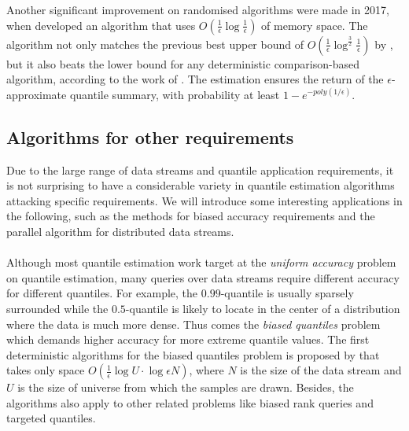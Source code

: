 Another significant improvement on randomised algorithms were made in 2017, when \citeauthor{felberRandomizedOnlineQuantile2017}\cite{felberRandomizedOnlineQuantile2017} developed an algorithm that uses $O(\frac{1}{\epsilon}\log \frac{1}{\epsilon})$ of memory space. The algorithm not only matches the previous best upper bound of $O(\frac{1}{\epsilon}\log^{\frac{3}{2}}\frac{1}{\epsilon})$ by \citeauthor{agarwalMergeableSummaries2013}\cite{agarwalMergeableSummaries2013}, but it also beats the lower bound for any deterministic comparison-based algorithm, according to the work of \citeauthor{hungLogSpaceLower2010}\cite{hungLogSpaceLower2010}. The estimation ensures the return of the $\epsilon$-approximate quantile summary, with probability at least $1-e^{-poly(1/\epsilon)}$.


\subsection{Algorithms for other requirements}
\label{other}
Due to the large range of data streams and quantile application requirements, it is not surprising to have a considerable variety in quantile estimation algorithms attacking specific requirements. We will introduce some interesting applications in the following, such as the methods for biased accuracy requirements and the parallel algorithm for distributed data streams.
\\\\
Although most quantile estimation work target at the \textit{uniform accuracy} problem on quantile estimation, many queries over data streams require different accuracy for different quantiles. For example, the $0.99$-quantile is usually sparsely surrounded while the $0.5$-quantile is likely to locate in the center of a distribution where the data is much more dense. Thus comes the \textit{biased quantiles} problem which demands higher accuracy for more extreme quantile values.
The first deterministic algorithms for the biased quantiles problem is proposed by \citeauthor{cormodeSpaceTimeefficientDeterministic2006} \cite{cormodeSpaceTimeefficientDeterministic2006} that takes only space $O(\frac{1}{\epsilon} \log {U} \cdot \log {\epsilon N})$, where $N$ is the size of the data stream and $U$ is the size of universe from which the samples are drawn. Besides, the algorithms also apply to other related problems like biased rank queries and targeted quantiles. 

